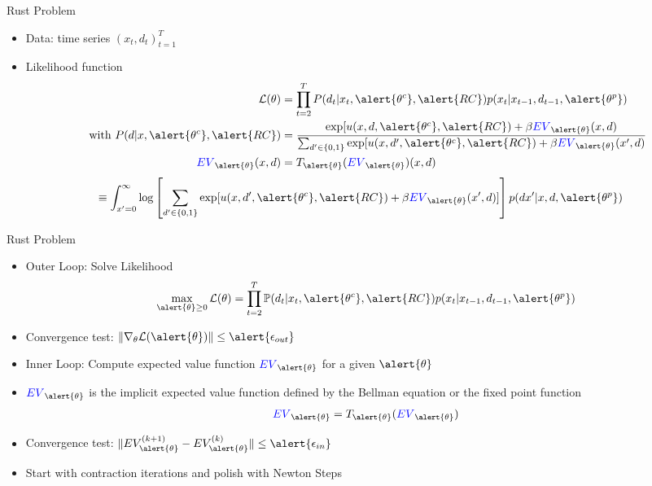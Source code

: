 \begin{frame}{Rust Problem}
\begin{itemize}
\item Data: time series $(x_t,d_t)_{t=1}^T$
\item Likelihood function
\begin{align*}
\mathcal{L}(\theta) &= \prod_{t=2}^T P(d_t | x_t, \alert{\theta^c}, \alert{RC}) p(x_t | x_{t-1}, d_{t-1},\alert{\theta^p})\\
\mbox{ with }  P(d | x, \alert{\theta^c}, \alert{RC}) &= \frac{\exp[u(x,d,\alert{\theta^c},\alert{RC}) + \beta \textcolor{blue}{EV}_{\alert{\theta}}(x,d)}
{\sum_{d' \in \{0,1\}} \exp[u(x,d',\alert{\theta^c},\alert{RC}) + \beta \textcolor{blue}{EV}_{\alert{\theta}}(x',d)}\\
\textcolor{blue}{EV}_{\alert{\theta}}(x,d) &= T_{\alert{\theta}}(\textcolor{blue}{EV}_{\alert{\theta}})(x,d)\\
\end{align*}
\vspace{-1cm}
\begin{align*}
\equiv \int_{x'=0}^{\infty} &\log \left[ \sum_{d' \in \{0,1\}} \exp[u(x,d',\alert{\theta^c},\alert{RC}) + \beta \textcolor{blue}{EV}_{\alert{\theta}}(x',d)]  \right] p(dx' | x,d,\alert{\theta^p}) 
\end{align*}
\end{itemize}
\end{frame}


\begin{frame}{Rust Problem}
\begin{itemize}
\item Outer Loop: Solve Likelihood
\begin{align*}
\max_{\alert{\theta} \geq 0} \mathcal{L}(\theta) &= \prod_{t=2}^T \Pr(d_t | x_t, \alert{\theta^c}, \alert{RC}) p(x_t | x_{t-1}, d_{t-1},\alert{\theta^p})\\
\end{align*}
\item Convergence test: $\norm{\nabla_{\theta} \mathcal{L}(\alert{\theta})} \leq \alert{\epsilon_{out}}$
\item Inner Loop: Compute expected value function $ \textcolor{blue}{EV}_{\alert{\theta}}$ for a given $\alert{\theta}$
\item $ \textcolor{blue}{EV}_{\alert{\theta}}$ is the implicit expected value function defined by the Bellman equation or the fixed point function
\begin{align*}
 \textcolor{blue}{EV}_{\alert{\theta}} = T_{\alert{\theta}}( \textcolor{blue}{EV}_{\alert{\theta}})
\end{align*}
\item Convergence test: $\norm{ EV^{(k+1)}_{\alert{\theta}} - EV^{(k)}_{\alert{\theta}} } \leq \alert{\epsilon_{in}}$
\item Start with contraction iterations and polish with Newton Steps
\end{itemize}
\end{frame}

